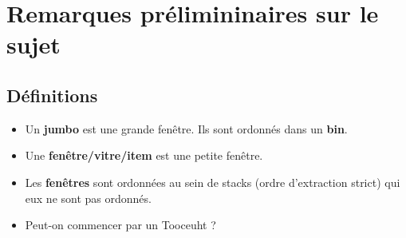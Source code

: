 \documentclass{article}
\begin{document}
\section{Remarques prélimininaires sur le sujet}
    \subsection{Définitions}
        \begin{itemize}
            \item Un \textbf{jumbo} est une grande fenêtre. Ils sont ordonnés dans un \textbf{bin}.
            \item Une \textbf{fenêtre/vitre/item} est une petite fenêtre.
            \item Les \textbf{fenêtres} sont ordonnées au sein de stacks (ordre d'extraction strict) qui eux ne sont pas ordonnés.
            \item Peut-on commencer par un Tooceuht ?
        \end{itemize}





\end{document}
